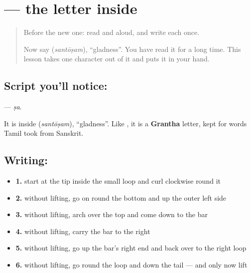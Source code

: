 \section[\texorpdfstring{\ta{ஷ} (ṣa)}{ஷ (ṣa)}]{ — the letter inside }

\label{lesson:TA-S140-letter-ssa}



\begin{quote}
Before the new one: read  and  aloud, and write each once.

Now say \textbf{} (\emph{santōṣam}), \textquotedblleft{}gladness\textquotedblright{}. You have read it for a long time. This lesson takes one character out of it and puts it in your hand.
\end{quote}

\subsection*{Script you'll notice: }
\textbf{} — \emph{ṣa}.

It is inside \textbf{} (\emph{santōṣam}), \textquotedblleft{}gladness\textquotedblright{}. Like , it is a \textbf{Grantha} letter, kept for words Tamil took from Sanskrit.

\subsection*{Writing: }

\begin{itemize}
\raggedright
  \item \textbf{1.} start at the tip inside the small loop and curl clockwise round it
  \item \textbf{2.} without lifting, go on round the bottom and up the outer left side
  \item \textbf{3.} without lifting, arch over the top and come down to the bar
  \item \textbf{4.} without lifting, carry the bar to the right
  \item \textbf{5.} without lifting, go up the bar's right end and back over to the right loop
  \item \textbf{6.} without lifting, go round the loop and down the tail — and only now lift
\end{itemize}

